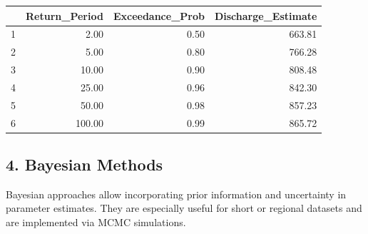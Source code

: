 \documentclass{tufte-handout}\usepackage[]{graphicx}\usepackage[]{xcolor}
\begin{document}
\begin{table}[ht]
\centering
\begin{tabular}{rrrr}
  \hline
 & Return\_Period & Exceedance\_Prob & Discharge\_Estimate \\ 
  \hline
1 & 2.00 & 0.50 & 663.81 \\ 
  2 & 5.00 & 0.80 & 766.28 \\ 
  3 & 10.00 & 0.90 & 808.48 \\ 
  4 & 25.00 & 0.96 & 842.30 \\ 
  5 & 50.00 & 0.98 & 857.23 \\ 
  6 & 100.00 & 0.99 & 865.72 \\ 
   \hline
\end{tabular}
\end{table}


\subsection{4. Bayesian Methods}

Bayesian approaches allow incorporating prior information and uncertainty in parameter estimates. They are especially useful for short or regional datasets and are implemented via MCMC simulations.
\end{document}
